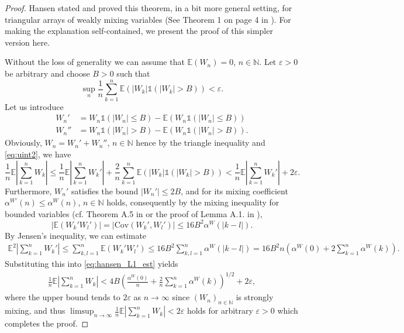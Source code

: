 \documentclass[a4paper,10pt]{article}
\newcommand{\N}{\mathbb{N}}
\newcommand{\E}{\mathbb{E}}
\newcommand{\ind}{\mathds{1}}
\newcommand{\eps}{\varepsilon}
\newcommand{\cov}{\mathrm{Cov}}
\begin{document}
\begin{proof}
	Hansen stated and proved this theorem, in a bit more general setting, for triangular arrays of weakly mixing variables (See Theorem 1 on page 4 in \cite{hansen2019weak}). For making the explanation self-contained, we present the proof of this simpler version here.
	
	
	Without the loss of generality we can assume that $\E (W_n)=0$, $n\in\N$. Let $\eps>0$ be arbitrary and choose $B>0$ such that
	\begin{equation}\label{eq:uint2}
		\sup_n\frac{1}{n}\sum_{k=1}^n \E (|W_k|\ind (|W_k|>B))<\eps.
	\end{equation}
	Let us introduce 
	\begin{align*}
		W_n'  &= W_n\ind (|W_n|\le B)-\E (W_n\ind (|W_n|\le B)) \\
		W_n'' &= W_n\ind (|W_n|> B)-\E (W_n\ind (|W_n|> B)).	
	\end{align*}
	Obviously, $W_n = W_n'+W_n''$, $n\in\N$ hence by the triangle inequality and \eqref{eq:uint2}, we have
	\begin{equation}\label{eq:hansen_L1_est}
		\frac{1}{n}\E\left|\sum_{k=1}^n W_k\right|
		\le
		\frac{1}{n}\E\left|\sum_{k=1}^n W_k'\right|+
		\frac{2}{n}\sum_{k=1}^n \E (|W_k|\ind (|W_k|>B))
		<\frac{1}{n}\E\left|\sum_{k=1}^n W_k'\right|+2\eps.
	\end{equation}
	Furthermore, $W_n'$ satisfies the bound $|W_n'|\le 2B$, and for its mixing coefficient
	$\alpha^{W'}(n)\le \alpha^W (n)$, $n\in\N$ holds, consequently by the mixing inequality
	for bounded variables (cf. Theorem A.5 in \cite{hall2014martingale} or the proof of Lemma A.1. in \cite{lovasCLT}), 
	$$
	|\E (W_k' W_l')|=|\cov (W_k',W_l')|\le 16 B^2 \alpha^W (|k-l|). 
	$$
	By Jensen's inequality, we can estimate
	\begin{align*}
		\E^2\left|\sum_{k=1}^n W_k'\right| 
		\le
		\sum_{k,l=1}^n \E (W_k' W_l')
		\le 
		16 B^2 
		\sum_{k,l=1}^n
		\alpha^W (|k-l|)=
		16B^2 n
		\left(
		\alpha^W (0)
		+
		2\sum_{k=1}^{n}
		\alpha^W (k)
		\right).
	\end{align*}
	Substituting this into \eqref{eq:hansen_L1_est} yields
	\begin{align*}
		\frac{1}{n}\E\left|\sum_{k=1}^n W_k\right|
		<
		4B \left(
		\frac{\alpha^W (0)}{n}
		+
		\frac{2}{n}\sum_{k=1}^{n}\alpha^W (k) 
		\right)^{1/2} + 2\eps,
	\end{align*}
	where the upper bound tends to $2\eps$ as $n\to\infty$ since $(W_n)_{n\in\N}$ is strongly mixing,
	and thus $\limsup_{n\to\infty}\frac{1}{n}\E\left|\sum_{k=1}^n W_k\right|<2\eps$ holds for arbitrary $\eps>0$ which completes the proof.	
\end{proof}
\end{document}
